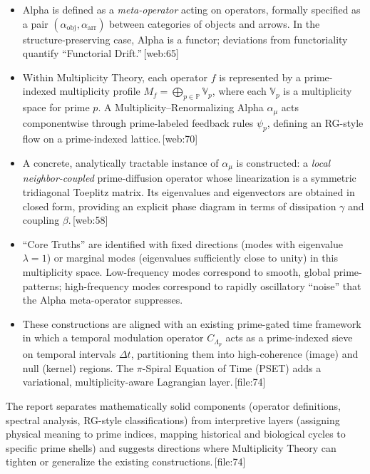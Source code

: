\documentclass[11pt]{article}
\begin{document}
\begin{itemize}
  \item Alpha is defined as a \emph{meta-operator} acting on operators, formally specified as a pair \((\alpha_{\mathrm{obj}},\alpha_{\mathrm{arr}})\) between categories of objects and arrows. In the structure-preserving case, Alpha is a functor; deviations from functoriality quantify ``Functorial Drift.''\,[web:65]
  \item Within Multiplicity Theory, each operator \(f\) is represented by a prime-indexed multiplicity profile \(M_f = \bigoplus_{p \in \mathbb{P}} \mathbb{V}_p\), where each \(\mathbb{V}_p\) is a multiplicity space for prime \(p\). A Multiplicity--Renormalizing Alpha \(\alpha_\mu\) acts componentwise through prime-labeled feedback rules \(\psi_p\), defining an RG-style flow on a prime-indexed lattice.\,[web:70]
  \item A concrete, analytically tractable instance of \(\alpha_\mu\) is constructed: a \emph{local neighbor-coupled} prime-diffusion operator whose linearization is a symmetric tridiagonal Toeplitz matrix. Its eigenvalues and eigenvectors are obtained in closed form, providing an explicit phase diagram in terms of dissipation \(\gamma\) and coupling \(\beta\).\,[web:58]
  \item ``Core Truths'' are identified with fixed directions (modes with eigenvalue \(\lambda = 1\)) or marginal modes (eigenvalues sufficiently close to unity) in this multiplicity space. Low-frequency modes correspond to smooth, global prime-patterns; high-frequency modes correspond to rapidly oscillatory ``noise'' that the Alpha meta-operator suppresses.
  \item These constructions are aligned with an existing prime-gated time framework in which a temporal modulation operator \(C_{\Lambda_p}\) acts as a prime-indexed sieve on temporal intervals \(\Delta t\), partitioning them into high-coherence (image) and null (kernel) regions. The \(\pi\)-Spiral Equation of Time (PSET) adds a variational, multiplicity-aware Lagrangian layer.\,[file:74]
\end{itemize}

The report separates mathematically solid components (operator definitions, spectral analysis, RG-style classifications) from interpretive layers (assigning physical meaning to prime indices, mapping historical and biological cycles to specific prime shells) and suggests directions where Multiplicity Theory can tighten or generalize the existing constructions.\,[file:74]
\end{document}
